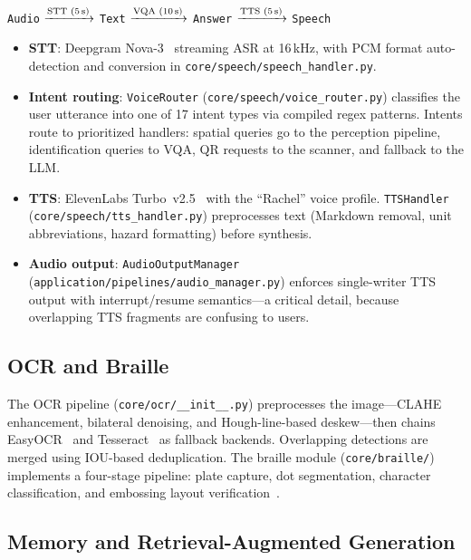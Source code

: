 \begin{center}
\texttt{Audio} $\xrightarrow{\text{STT (5\,s)}}$ \texttt{Text} $\xrightarrow{\text{VQA (10\,s)}}$ \texttt{Answer} $\xrightarrow{\text{TTS (5\,s)}}$ \texttt{Speech}
\end{center}

\begin{itemize}
    \item \textbf{STT}: Deepgram Nova-3~\cite{deepgram2023nova} streaming ASR at 16\,kHz, with PCM format auto-detection and conversion in \texttt{core/speech/speech\_handler.py}.
    \item \textbf{Intent routing}: \texttt{VoiceRouter} (\texttt{core/speech/voice\_router.py}) classifies the user utterance into one of 17 intent types via compiled regex patterns. Intents route to prioritized handlers: spatial queries go to the perception pipeline, identification queries to VQA, QR requests to the scanner, and fallback to the LLM.
    \item \textbf{TTS}: ElevenLabs Turbo~v2.5~\cite{elevenlabs2023tts} with the ``Rachel'' voice profile. \texttt{TTSHandler} (\texttt{core/speech/tts\_handler.py}) preprocesses text (Markdown removal, unit abbreviations, hazard formatting) before synthesis.
    \item \textbf{Audio output}: \texttt{AudioOutputManager} (\texttt{application/pipelines/audio\_manager.py}) enforces single-writer TTS output with interrupt/resume semantics---a critical detail, because overlapping TTS fragments are confusing to users.
\end{itemize}

\subsection{OCR and Braille}

The OCR pipeline (\texttt{core/ocr/\_\_init\_\_.py}) preprocesses the image---CLAHE enhancement, bilateral denoising, and Hough-line-based deskew---then chains EasyOCR~\cite{jaided2020easyocr} and Tesseract~\cite{smith2007tesseract} as fallback backends. Overlapping detections are merged using IOU-based deduplication. The braille module (\texttt{core/braille/}) implements a four-stage pipeline: plate capture, dot segmentation, character classification, and embossing layout verification~\cite{li2020optical_braille}.

\subsection{Memory and Retrieval-Augmented Generation}

